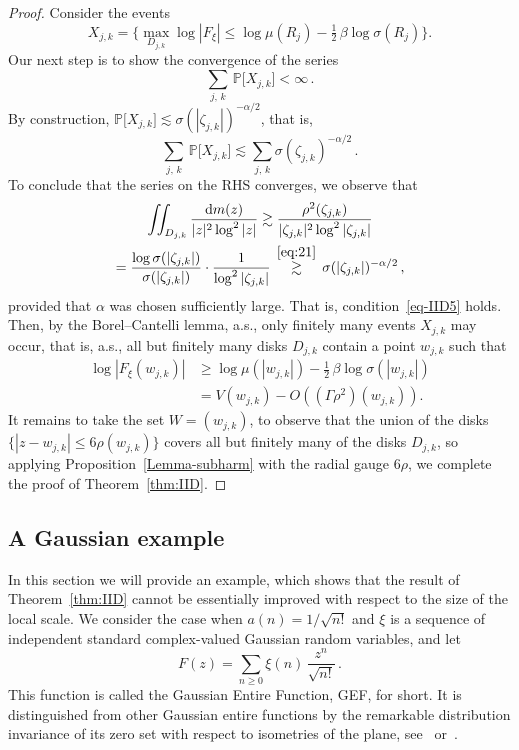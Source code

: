 \documentclass[11pt]{amsart}
\numberwithin{equation}{section}
\newcommand{\bP}{\mathbb P}
\begin{document}
\begin{proof}
Consider the events
\[
X_{j, k} = \bigl\{\max_{D_{j, k}} \log |F_\xi| \le \log\mu(R_j) - \tfrac12\, \beta
\log\sigma (R_j)  \bigr\}.
\]
Our next step is to show the convergence of the series
\begin{equation}\label{eq-IID5}
\sum_{j,\, k}\, \bP\bigl[ X_{j, k} \bigr] < \infty\,.
\end{equation}
By construction, $\bP\bigl[ X_{j, k} \bigr] \lesssim \sigma (|\zeta_{j, k}|)^{-\alpha/2}$,
that is,
\[
\sum_{j,\, k}\, \bP\bigl[ X_{j, k} \bigr]
\lesssim \sum_{j,\, k} \sigma(\zeta_{j, k})^{-\alpha/2}\,.
\]
To conclude that the series on the RHS converges, we observe that
\begin{multline*}
\iint_{D_{j, k}} \frac{{\rm d}m(z)}{|z|^2\log^2|z|}
\gtrsim \frac{\rho^2(\zeta_{j, k})}{|\zeta_{j, k}|^2 \log^2|\zeta_{j, k}|} \\
= \frac{\log \sigma (|\zeta_{j, k}|)}{\sigma (|\zeta_{j, k}|)} \cdot \frac1{\log^2 |\zeta_{j, k}|}
\, \stackrel{\eqref{eq:21}}\gtrsim\, \sigma (|\zeta_{j, k}|)^{-\alpha/2}\,,
\end{multline*}
provided that $\alpha$ was chosen sufficiently large. That is, condition~\eqref{eq-IID5} holds.
Then, by the Borel--Cantelli lemma, a.s., only finitely many events $X_{j, k}$ may occur, that is,
a.s., all but finitely many disks $D_{j, k}$ contain a point $w_{j, k}$ such that
\begin{align*}
\log |F_\xi (w_{j,k})| &\ge \log\mu(|w_{j, k}|) - \tfrac12\, \beta \log\sigma (|w_{j, k}|) \\
&= V(w_{j, k}) - O((\Gamma\rho^2)(w_{j, k})).
\end{align*}
It remains to take the set $W=(w_{j, k})$, to observe that the union of the
disks $\{|z-w_{j, k}|\le 6\rho(w_{j, k})\}$ covers all but finitely many of the disks
$D_{j, k}$, so applying Proposition~\ref{Lemma-subharm} with the radial gauge $6\rho$,
we complete the proof of Theorem~\ref{thm:IID}.
\end{proof}

\subsection{A Gaussian example}
In this section we will provide an example, which shows that the result of Theorem~\ref{thm:IID}
cannot be essentially improved with respect to the size of the local scale. We consider the case
when $a(n)=1/\sqrt{n!}$ and $\xi$ is a sequence of independent standard complex-valued Gaussian random
variables, and let
\[
F(z) = \sum_{n\ge 0} \xi(n)\, \frac{z^n}{\sqrt{n!}}\,.
\]
This function is called the Gaussian Entire Function, GEF, for short.
It is distinguished from other Gaussian entire functions by the remarkable
distribution invariance of its zero set with respect to isometries of the plane,
see~\cite[Ch.~2]{HKPV} or~\cite{NS-WhatIs}.
\end{document}
